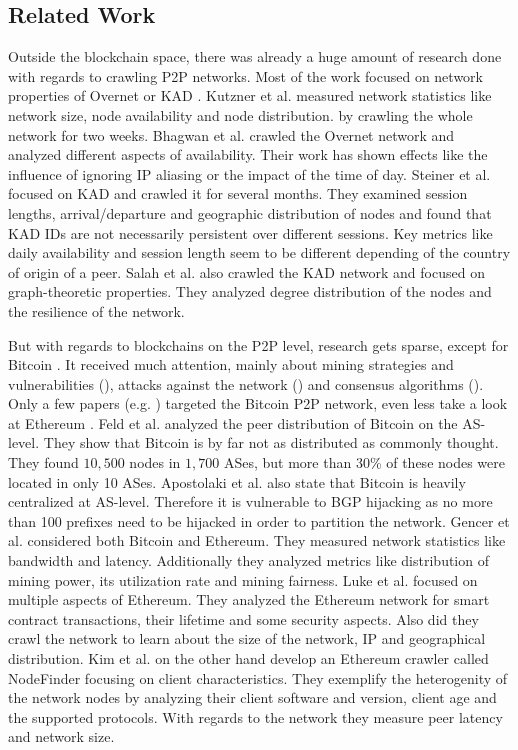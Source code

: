 \documentclass[10pt,conference,final]{IEEEtran}
\begin{document}
\subsection{Related Work}
\label{sec:RelatedWork}
Outside the blockchain space, there was already a huge amount of research done with regards to crawling P2P networks.
Most of the work focused on network properties of Overnet \cite{22,24} or KAD \cite{23,25,18}.
Kutzner et al. \cite{22} measured network statistics like network size, node availability and node distribution. by crawling the whole network for two weeks.
Bhagwan et al. \cite{24} crawled the Overnet network and analyzed different aspects of availability.
Their work has shown effects like the influence of ignoring IP aliasing or the impact of the time of day.
Steiner et al. \cite{23,25} focused on KAD and crawled it for several months.
They examined session lengths, arrival/departure and geographic distribution of nodes and found that KAD IDs are not necessarily persistent over different sessions.
Key metrics like daily availability and session length seem to be different depending of the country of origin of a peer.
Salah et al. \cite{18} also crawled the KAD network and focused on graph-theoretic properties.
They analyzed degree distribution of the nodes and the resilience of the network.

But with regards to blockchains on the P2P level, research gets sparse, except for Bitcoin \cite{26}.
It received much attention, mainly about mining strategies and vulnerabilities (\cite{27,28,29,30}), attacks against the network (\cite{31,32}) and consensus algorithms (\cite{33,34}).
Only a few papers (e.g. \cite{37,35,36}) targeted the Bitcoin P2P network, even less take a look at Ethereum \cite{13,21}.
Feld et al. \cite{36} analyzed the peer distribution of Bitcoin on the AS-level.
They show that Bitcoin is by far not as distributed as commonly thought.
They found $10,500$ nodes in $1,700$ ASes, but more than 30\% of these nodes were located in only 10 ASes.
Apostolaki et al. \cite{37} also state that Bitcoin is heavily centralized at AS-level.
Therefore it is vulnerable to BGP hijacking as no more than 100 prefixes need to be hijacked in order to partition the network.
Gencer et al. \cite{35} considered both Bitcoin and Ethereum.
They measured network statistics like bandwidth and latency.
Additionally they analyzed metrics like distribution of mining power, its utilization rate and mining fairness.
Luke et al. \cite{21} focused on multiple aspects of Ethereum.
They analyzed the Ethereum network for smart contract transactions, their lifetime and some security aspects.
Also did they crawl the network to learn about the size of the network, IP and geographical distribution.
Kim et al. \cite{13} on the other hand develop an Ethereum crawler called NodeFinder focusing on client characteristics.
They exemplify the heterogenity of the network nodes by analyzing their client software and version, client age and the supported protocols.
With regards to the network they measure peer latency and network size.
\end{document}
